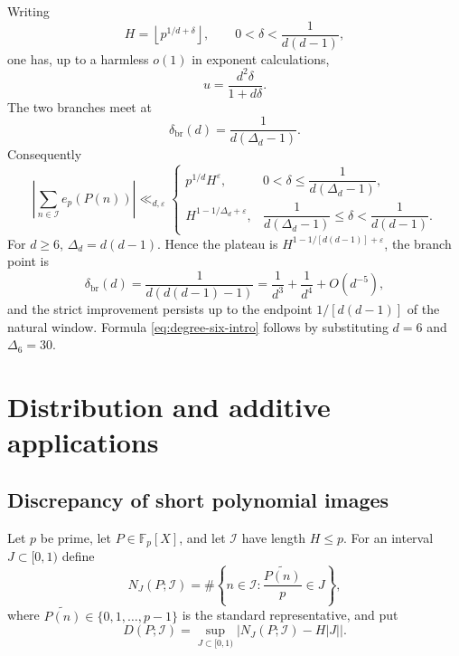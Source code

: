 \documentclass[11pt,reqno]{amsart}
\numberwithin{equation}{section}
\theoremstyle{definition}
\theoremstyle{remark}
\begin{document}
Writing
\begin{equation}\label{eq:H-delta}
  H=\left\lfloor p^{1/d+\delta}\right\rfloor,
  \qquad 0<\delta<\frac1{d(d-1)},
\end{equation}
one has, up to a harmless $o(1)$ in exponent calculations,
\begin{equation}\label{eq:u-delta}
  u=\frac{d^2\delta}{1+d\delta}.
\end{equation}
The two branches meet at
\begin{equation}\label{eq:delta-branch-general}
  \delta_{\mathrm{br}}(d)=\frac1{d(\Delta_d-1)}.
\end{equation}
Consequently
\begin{equation}\label{eq:delta-piecewise-general}
  \left|\sum_{n\in\mathcal I}e_p(P(n))\right|
  \ll_{d,\varepsilon}
  \begin{cases}
    p^{1/d}H^\varepsilon,
      &0<\delta\le\dfrac1{d(\Delta_d-1)},\\[3mm]
    H^{1-1/\Delta_d+\varepsilon},
      &\dfrac1{d(\Delta_d-1)}\le\delta<\dfrac1{d(d-1)}.
  \end{cases}
\end{equation}
For $d\ge6$, $\Delta_d=d(d-1)$.  Hence the plateau is
$H^{1-1/[d(d-1)]+\varepsilon}$, the branch point is
\[
  \delta_{\mathrm{br}}(d)
  =\frac1{d(d(d-1)-1)}
  =\frac1{d^3}+\frac1{d^4}+O(d^{-5}),
\]
and the strict improvement persists up to the endpoint
$1/[d(d-1)]$ of the natural window.  Formula \eqref{eq:degree-six-intro} follows by substituting $d=6$ and $\Delta_6=30$.

\section{Distribution and additive applications}\label{sec:distribution-applications}

\subsection{Discrepancy of short polynomial images}

Let $p$ be prime, let $P\in\mathbb F_p[X]$, and let $\mathcal I$ have length $H\le p$.  For an interval $J\subset[0,1)$ define
\[
  N_J(P;\mathcal I)
  =\#\left\{n\in\mathcal I:
  \frac{\widetilde{P(n)}}p\in J\right\},
\]
where $\widetilde{P(n)}\in\{0,1,\ldots,p-1\}$ is the standard representative, and put
\begin{equation}\label{eq:discrepancy-definition}
  D(P;\mathcal I)
  =\sup_{J\subset[0,1)}
  \left|N_J(P;\mathcal I)-H|J|\right|.
\end{equation}
\end{document}
